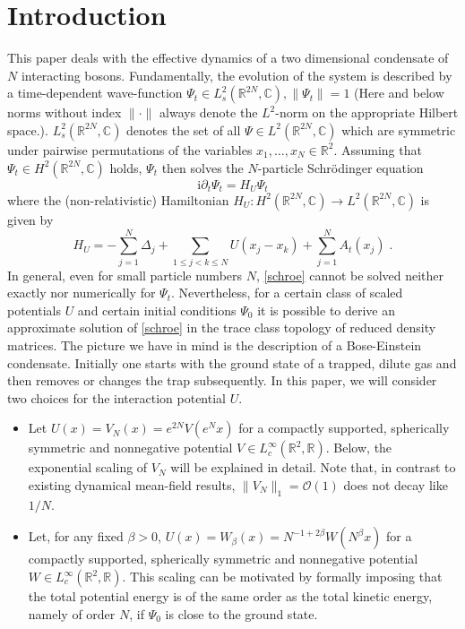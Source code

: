 \documentclass[11pt, english, american]{article}
\newcommand{\be}{\begin{equation}}
\newcommand{\ee}{\end{equation}}
\newcommand{\im}{\text{i}}
\begin{document}
\newpage
\section{Introduction}
This paper deals with the effective dynamics of a two dimensional condensate
of $N$ interacting bosons. 
Fundamentally, the evolution of the system is described by a time-dependent wave-function $\Psi_t \in L^2_{s}(\mathbb{R}^{2N}, \mathbb{C}),
\| \Psi_t \|=1$ (Here and below norms without index $\|\cdot\|$ always denote the $L^2$-norm on the appropriate Hilbert space.).
$L^2_{s}(\mathbb{R}^{2N}, \mathbb{C})$ denotes the set of all $\Psi \in  L^2(\mathbb{R}^{2N}, \mathbb{C})$
 which are symmetric under pairwise permutations of the variables 
$x_1, \dots, x_N \in \mathbb{R}^2$. Assuming that $\Psi_t \in H^2 (\mathbb{R}^{2N},\mathbb{C})$ holds, $\Psi_t$ then solves the  $N$-particle 
Schr\"odinger equation 
\be\label{schroe} \im\partial_t \Psi_t = H_U\Psi_t \ee 
where the  (non-relativistic) Hamiltonian $H_U:H^2 (\mathbb{R}^{2N},\mathbb{C}) \rightarrow L^2 (\mathbb{R}^{2N},\mathbb{C})$ is given by
\be\label{hamiltonian}
 H_U=-\sum_{j=1}^N \Delta_j+\sum_{1\leq  j< k\leq  N} U(x_j-x_k) +\sum _{j=1}^N A_t(x_j)
 \; .
 \ee
In general, even for small particle numbers $N$, \eqref{schroe} cannot be solved neither exactly nor numerically for $\Psi_t$. Nevertheless, for a certain class of scaled potentials $U$ and certain initial conditions $\Psi_0$ it is possible to derive an approximate solution of \eqref{schroe} in the trace class topology of reduced density matrices.
The picture we have in mind is the description of a Bose-Einstein condensate. Initially one starts with the ground state of a trapped, dilute gas and then removes or changes the trap subsequently.
In this paper, we will consider two choices for the interaction potential $U$.
\begin{itemize}
\item
Let  $U(x) = V_N(x)=e^{2N} V(e^N x) $ for a compactly supported, spherically symmetric and nonnegative potential $V\in
L^\infty_c (\mathbb{R}^2, \mathbb{R}) $.
 Below, the exponential scaling of $V_N$ will be explained in detail.
 Note that, in contrast to existing dynamical mean-field results, $\| V_N \|_1= \mathcal{O}(1)$ does not decay like $1/N$.
 \item
Let, for any fixed $\beta>0$, 
 $U(x)= W_\beta(x)= N^{-1+2 \beta} W(N^\beta x)$ for a compactly supported, spherically symmetric and nonnegative potential $W \in L^\infty_c (\mathbb{R}^2, \mathbb{R}) $.
This scaling can be motivated by formally imposing that the total potential energy is of the same order as the total kinetic energy, namely of order $N$,  if  $\Psi_0$ is close to the ground state. 
\end{itemize}
\end{document}
